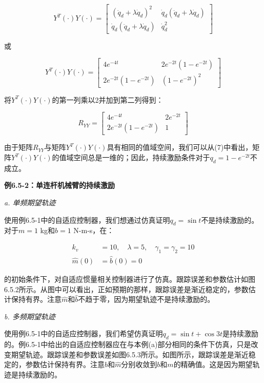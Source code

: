 \documentclass[12pt,a4paper]{ctexart}
\begin{document}
\begin{equation}
Y^T(\cdot)Y(\cdot) = \begin{bmatrix} (\ddot{q}_d + \lambda \dot{q}_d)^2 & \dot{q}_d(\ddot{q}_d + \lambda \dot{q}_d) \\ \dot{q}_d(\ddot{q}_d + \lambda \dot{q}_d) & \dot{q}_d^2 \end{bmatrix}
\end{equation}

或

\begin{equation}
Y^T(\cdot)Y(\cdot) = \begin{bmatrix} 4e^{-4t} & 2e^{-2t}(1-e^{-2t}) \\ 2e^{-2t}(1-e^{-2t}) & (1-e^{-2t})^2 \end{bmatrix}
\end{equation}

将$Y^T(\cdot)Y(\cdot)$的第一列乘以2并加到第二列得到：

\begin{equation}
R_{YY} = \begin{bmatrix} 4e^{-4t} & 2e^{-2t} \\ 2e^{-2t}(1-e^{-2t}) & 1 \end{bmatrix}
\end{equation}

由于矩阵$R_{YY}$与矩阵$Y^T(\cdot)Y(\cdot)$具有相同的值域空间，我们可以从(7)中看出，矩阵$Y^T(\cdot)Y(\cdot)$的值域空间总是一维的；因此，持续激励条件对于$q_d = 1 - e^{-2t}$不成立。

\textbf{例6.5-2：单连杆机械臂的持续激励}

\textit{a. 单频期望轨迹}

使用例6.5-1中的自适应控制器，我们想通过仿真证明$q_d = \sin t$不是持续激励的。对于$m = 1$ kg和$b = 1$ N-m-s，在：

\begin{align}
k_v &= 10, \quad \lambda = 5, \quad \gamma_1 = \gamma_2 = 10 \\
\hat{m}(0) &= \hat{b}(0) = 0
\end{align}

的初始条件下，对自适应惯量相关控制器进行了仿真。跟踪误差和参数估计如图6.5.2所示。从图中可以看出，正如预期的那样，跟踪误差是渐近稳定的，参数估计保持有界。注意$\hat{m}$和$\hat{b}$不趋于零，因为期望轨迹不是持续激励的。

\textit{b. 多频期望轨迹}

使用例6.5-1中的自适应控制器，我们希望仿真证明$q_d = \sin t + \cos 3t$是持续激励的。例6.5-1中给出的自适应控制器应在与本例(a)部分相同的条件下仿真，只是改变期望轨迹。跟踪误差和参数误差如图6.5.3所示。如图所示，跟踪误差是渐近稳定的，参数估计保持有界。注意$\hat{b}$和$\hat{m}$分别收敛到$b$和$m$的精确值。这是因为期望轨迹是持续激励的。
\end{document}
